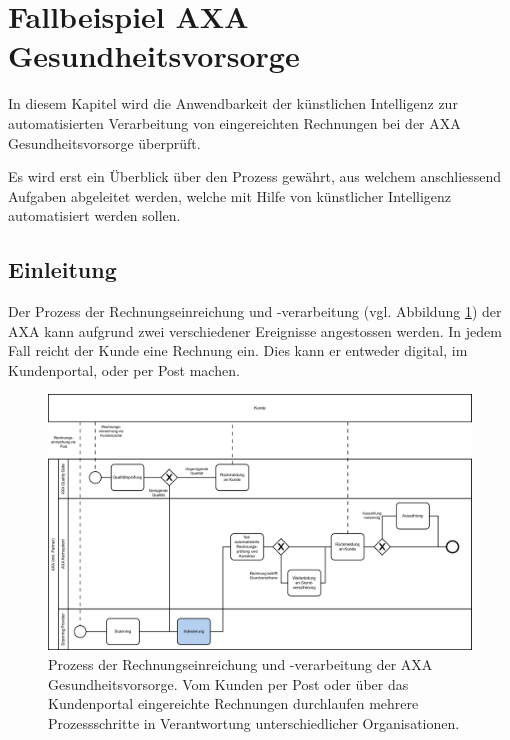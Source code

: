 \section{Fallbeispiel AXA Gesundheitsvorsorge}

In diesem Kapitel wird die Anwendbarkeit der künstlichen Intelligenz zur automatisierten Verarbeitung von eingereichten Rechnungen bei der AXA Gesundheitsvorsorge überprüft.

Es wird erst ein Überblick über den Prozess gewährt, aus welchem anschliessend Aufgaben abgeleitet werden, welche mit Hilfe von künstlicher Intelligenz automatisiert werden sollen.

\subsection{Einleitung}


Der Prozess der Rechnungseinreichung und -verarbeitung (vgl. Abbildung \ref{prozessaxa}) der AXA kann aufgrund zwei verschiedener Ereignisse angestossen werden. In jedem Fall reicht der Kunde eine Rechnung ein. Dies kann er entweder digital, im Kundenportal, oder per Post machen. 

\begin{figure}[h]
    \captionsetup{width=.8\linewidth}
    \caption{Prozess der Rechnungseinreichung und -verarbeitung der AXA Gesundheitsvorsorge. Vom Kunden per Post oder über das Kundenportal eingereichte Rechnungen durchlaufen mehrere Prozessschritte in Verantwortung unterschiedlicher Organisationen.}
    \label{prozessaxa}
    \centering
    \vspace{0.2cm}
    \includegraphics[width=\textwidth]{graphics/rechnungseinreichung-bpmn.pdf}
\end{figure}

